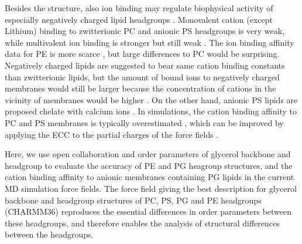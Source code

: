 \documentclass[aps,prl,superscriptaddress,twocolumn]{revtex4}
\begin{document}
Besides the structure, also ion binding may regulate biophysical activity of especially negatively
charged lipid headgroups \cite{seelig90}. Monovalent cation (except Lithium) binding to zwitterionic PC and anionic PS headgroups is
very weak, while multivalent ion binding is stronger but still weak \cite{cevc90,tocanne90,roux90,catte16,antila19}. The ion binding affinity
data for PE is more scarce \cite{marra85}, but large differences to PC would be surprising.
Negatively charged lipids are suggested to bear same cation binding constants than zwitterionic lipids, but
the amount of bound ions to negatively charged membranes would still be larger because
the concentration of cations in the vicinity of membranes would be higher  \cite{seelig90}.
On the other hand, anionic PS lipids are proposed chelate with calcium ions \cite{hauser85,feigenson86,roux91}.
In simulations, the cation binding affinity to PC and PS membranes is typically overestimated \cite{catte16,antila19},
which can be improved by applying the ECC to the partial charges of the force fields \cite{melcr18,melcr19}.

Here, we use open collaboration and order parameters of glycerol backbone and headgroup
to evaluate the accuracy of PE and PG heagroup structures, and the cation binding affinity
to anionic membranes containing PG lipids in the current MD simulation force fields.
The force field giving the best description for glycerol backbone and headgroup structures
of PC, PS, PG and PE headgroups (CHARMM36) reproduces the essential differences in order parameters
between these headgroups, and therefore enables the analysis of structural differences between the
headgroups.
\end{document}
